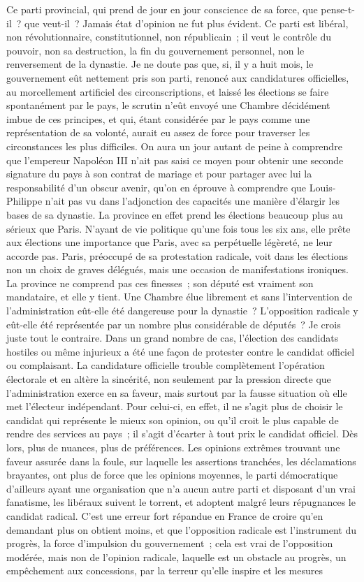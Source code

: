 \documentclass[french,twoside]{book} %
\begin{document}
Ce parti provincial, qui prend de jour en jour conscience de sa force, que pense-t-il ? que veut-il ? Jamais état d’opinion ne fut plus évident. Ce parti est libéral, non révolutionnaire, constitutionnel, non républicain ; il veut le contrôle du pouvoir, non sa destruction, la fin du gouvernement personnel, non le renversement de la dynastie. Je ne doute pas que, si, il y a huit mois, le gouvernement eût nettement pris son parti, renoncé aux candidatures officielles, au morcellement artificiel des circonscriptions, et laissé les élections se faire spontanément par le pays, le scrutin n’eût envoyé une Chambre décidément imbue de ces principes, et qui, étant considérée par le pays comme une représentation de sa volonté, aurait eu assez de force pour traverser les circonstances les plus difficiles. On aura un jour autant de peine à comprendre que l’empereur Napoléon III n’ait pas saisi ce moyen pour obtenir une seconde signature du pays à son contrat de mariage et pour partager avec lui la responsabilité d’un obscur avenir, qu’on en éprouve à comprendre que Louis-Philippe n’ait pas vu dans l’adjonction des capacités une manière d’élargir les bases de sa dynastie. La province en effet prend les élections beaucoup plus au sérieux que Paris. N’ayant de vie politique qu’une fois tous les six ans, elle prête aux élections une importance que Paris, avec sa perpétuelle légèreté, ne leur accorde pas. Paris, préoccupé de sa protestation radicale, voit dans les élections non un choix de graves délégués, mais une occasion de manifestations ironiques. La province ne comprend pas ces finesses ; son député est vraiment son mandataire, et elle y tient. Une Chambre élue librement et sans l’intervention de l’administration eût-elle été dangereuse pour la dynastie ? L’opposition radicale y eût-elle été représentée par un nombre plus considérable de députés ? Je crois juste tout le contraire. Dans un grand nombre de cas, l’élection des candidats hostiles ou même injurieux a été une façon de protester contre le candidat officiel ou complaisant. La candidature officielle trouble complètement l’opération électorale et en altère la sincérité, non seulement par la pression directe que l’administration exerce en sa faveur, mais surtout par la fausse situation où elle met l’électeur indépendant. Pour celui-ci, en effet, il ne s’agit plus de choisir le candidat qui représente le mieux son opinion, ou qu’il croit le plus capable de rendre des services au pays ; il s’agit d’écarter à tout prix le candidat officiel. Dès lors, plus de nuances, plus de préférences. Les opinions extrêmes trouvant une faveur assurée dans la foule, sur laquelle les assertions tranchées, les déclamations brayantes, ont plus de force que les opinions moyennes, le parti démocratique d’ailleurs ayant une organisation que n’a aucun autre parti et disposant d’un vrai fanatisme, les libéraux suivent le torrent, et adoptent malgré leurs répugnances le candidat radical. C’est une erreur fort répandue en France de croire qu’en demandant plus on obtient moins, et que l’opposition radicale est l’instrument du progrès, la force d’impulsion du gouvernement ; cela est vrai de l’opposition modérée, mais non de l’opinion radicale, laquelle est un obstacle au progrès, un empêchement aux concessions, par la terreur qu’elle inspire et les mesures 
\end{document}
